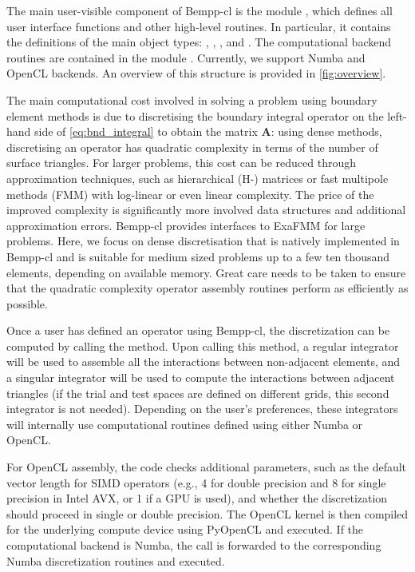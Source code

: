 \documentclass{IEEEcsmag}
\newcommand{\dmat}[1]{\mathbf{#1}}
\begin{document}
The main user-visible component of Bempp-cl is the module , which defines all user interface functions and other high-level routines. In particular, it contains the definitions of the main object types: \mbox{,} \mbox{,} \mbox{,} and . The computational backend routines are contained in the module . Currently, we support Numba and OpenCL backends. An overview of this structure is provided in \cref{fig:overview}.

The main computational cost involved in solving a problem using boundary element methods is due to discretising the boundary integral operator on the left-hand side of \cref{eq:bnd_integral} to obtain the matrix $\dmat{A}$: using dense methods, discretising an operator has quadratic complexity in terms of the number of surface triangles. For larger problems, this cost can be reduced through approximation techniques, such as hierarchical (H-) matrices or fast multipole methods (FMM) with log-linear or even linear complexity. The price of the improved complexity is significantly more involved data structures and additional approximation errors. Bempp-cl provides interfaces to ExaFMM \cite{bempp_exafmm} for large problems. Here, we focus on dense discretisation that is natively implemented in Bempp-cl and is suitable for medium sized problems up to a few ten thousand elements, depending on available memory. Great care needs to be taken to ensure that the quadratic complexity operator assembly routines perform as efficiently as possible.

Once a user has defined an operator using Bempp-cl, the discretization can be computed by calling the  method. Upon calling this method, a regular integrator will be used to assemble all the interactions between non-adjacent elements, and a singular integrator will be used to compute the interactions between adjacent triangles (if the trial and test spaces are defined on different grids, this second integrator is not needed). Depending on the user's preferences, these integrators will internally use computational routines defined using either Numba or OpenCL.

For OpenCL assembly, the code checks additional parameters, such as the default vector length for SIMD operators (e.g., 4 for double precision and 8 for single precision in Intel AVX, or 1 if a GPU is used), and whether the discretization should proceed in single or double precision. The OpenCL kernel is then compiled for the underlying compute device using PyOpenCL and executed. If the computational backend is Numba, the call is forwarded to the corresponding Numba discretization routines and executed.
\end{document}
